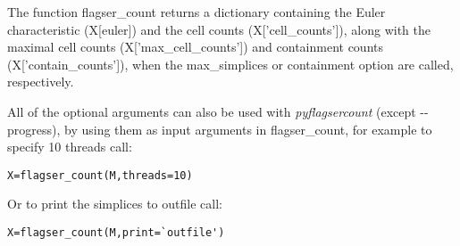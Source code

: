 \documentclass{amsart}
\theoremstyle{definition}
\begin{document}
The function flagser\_count returns a dictionary containing the Euler characteristic (X[euler]) and the cell counts (X['cell\_counts']), along with the maximal cell counts (X['max\_cell\_counts']) and containment counts (X['contain\_counts']), when the max\_simplices or containment option are called, respectively.

All of the optional arguments can also be used with \textit{pyflagsercount} (except -{}-progress), by using them as input arguments in flagser\_count, for example to specify 10 threads call:
\begin{verbatim}X=flagser_count(M,threads=10)\end{verbatim}
Or to print the simplices to outfile call:
\begin{verbatim}X=flagser_count(M,print=`outfile')\end{verbatim}
\end{document}
